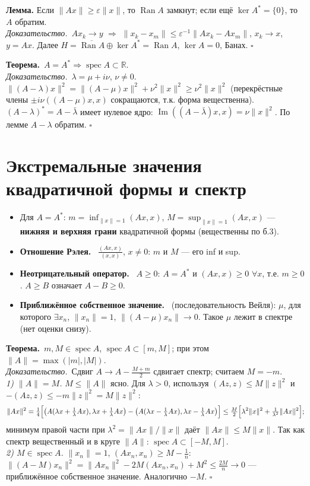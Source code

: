 \documentclass[11pt,a4paper]{article}
\newcommand{\RR}{\mathbb R}
\newcommand{\spec}{\operatorname{spec}}
\newcommand{\Ran}{\operatorname{Ran}}
\newcommand{\df}[1]{\textbf{#1.}~}
\newcommand{\thm}{\textbf{Теорема.}~}
\newcommand{\pf}{\textit{Доказательство.}~}
\newcommand{\qedd}{\hfill$\square$}
\begin{document}
\textbf{Лемма.} Если $\|Ax\|\ge\varepsilon\|x\|$, то $\Ran A$ замкнут; если ещё $\ker A^*=\{0\}$, то $A$ обратим.\\
\pf $Ax_k\to y$ $\Rightarrow$ $\|x_k-x_m\|\le\varepsilon^{-1}\|Ax_k-Ax_m\|$, $x_k\to x$, $y=Ax$. Далее $H=\overline{\Ran A}\oplus\ker A^*=\Ran A$, $\ker A=0$, Банах. \qedd

\thm $A=A^*\Rightarrow\spec A\subset\RR$.\\
\pf $\lambda=\mu+i\nu$, $\nu\ne0$. $\|(A-\lambda)x\|^2=\|(A-\mu)x\|^2+\nu^2\|x\|^2\ge\nu^2\|x\|^2$ (перекрёстные члены $\pm i\nu((A-\mu)x,x)$ сокращаются, т.к. форма вещественна). $(A-\lambda)^*=A-\bar\lambda$ имеет нулевое ядро: $\operatorname{Im}((A-\bar\lambda)x,x)=\nu\|x\|^2$. По лемме $A-\lambda$ обратим. \qedd

\section{Экстремальные значения квадратичной формы и спектр}
\begin{defs}
\begin{itemize}
\item Для $A=A^*$: $m=\inf_{\|x\|=1}(Ax,x)$, $M=\sup_{\|x\|=1}(Ax,x)$ — \textbf{нижняя и верхняя грани} квадратичной формы (вещественны по б.3).
\item \df{Отношение Рэлея} $\frac{(Ax,x)}{(x,x)}$, $x\ne0$: $m$ и $M$ — его inf и sup.
\item \df{Неотрицательный оператор} $A\ge0$: $A=A^*$ и $(Ax,x)\ge0$ $\forall x$, т.е. $m\ge0$. $A\ge B$ означает $A-B\ge0$.
\item \df{Приближённое собственное значение} (последовательность Вейля): $\mu$, для которого $\exists x_n$, $\|x_n\|=1$, $\|(A-\mu)x_n\|\to0$. Такое $\mu$ лежит в спектре (нет оценки снизу).
\end{itemize}
\end{defs}

\thm $m,M\in\spec A$, $\spec A\subset[m,M]$; при этом $\|A\|=\max(|m|,|M|)$.\\
\pf Сдвиг $A\to A-\frac{M+m}2$ сдвигает спектр; считаем $M=-m$.\\
\textit{1) $\|A\|=M$.} $M\le\|A\|$ ясно. Для $\lambda>0$, используя $(Az,z)\le M\|z\|^2$ и $-(Az,z)\le-m\|z\|^2=M\|z\|^2$:
\[\|Ax\|^2=\tfrac14\Bigl[\bigl(A(\lambda x+\tfrac1\lambda Ax),\lambda x+\tfrac1\lambda Ax\bigr)-\bigl(A(\lambda x-\tfrac1\lambda Ax),\lambda x-\tfrac1\lambda Ax\bigr)\Bigr]\le\tfrac M2\Bigl[\lambda^2\|x\|^2+\tfrac1{\lambda^2}\|Ax\|^2\Bigr];\]
минимум правой части при $\lambda^2=\|Ax\|/\|x\|$ даёт $\|Ax\|\le M\|x\|$. Так как спектр вещественный и в круге $\|A\|$: $\spec A\subset[-M,M]$.\\
\textit{2) $M\in\spec A$.} $\|x_n\|=1$, $(Ax_n,x_n)\ge M-\frac1n$: $\|(A-M)x_n\|^2=\|Ax_n\|^2-2M(Ax_n,x_n)+M^2\le\frac{2M}n\to0$ — приближённое собственное значение. Аналогично $-M$. \qedd
\end{document}
